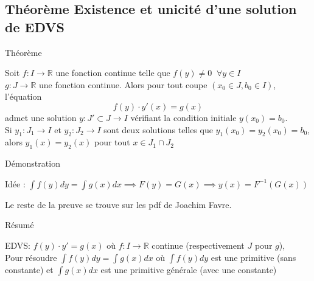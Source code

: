\subsection{Théorème Existence et unicité d'une solution de EDVS}
\begin{parag}{Théorème}
    \begin{theoreme}
        Soit $f: I \to \mathbb{R}$ une fonction continue telle que $f(y) \neq 0 \; \; \forall y \in I$
        \\
        $g : J \to \mathbb{R}$ une fonction continue. Alors pour tout coupe $(x_0 \in J, b_0 \in I)$, l'équation
        \[f(y)\cdot y'(x) = g(x)\]
        admet une solution $y : J' \subset J \to I$ vérifiant la condition initiale $y(x_0) = b_0$.
        \\
        Si $y_1: J_1 \to I $ et $y_2 : J_2 \to I$ sont deux solutions telles que $y_1(x_0) = y_2(x_0) = b_0$, alors $y_1 (x) = y_2(x)$ pour tout $x \in J_1 \cap J_2$
    \end{theoreme}
\end{parag}
\begin{parag}{Démonstration}
    \begin{framedremark}
        Idée : $\int f(y)dy = \int g(x)dx \implies F(y) = G(x) \implies y(x) = F^{-1}(G(x))$
    \end{framedremark}
    Le reste de la preuve se trouve sur les pdf de Joachim Favre.
\end{parag}
\begin{parag}{Résumé}
\begin{resume}
        EDVS:
        $f(y)\cdot y' = g(x)$ où $f: I \to \mathbb{R}$ continue (respectivement $J$ pour $g$), 
        \\
        Pour résoudre $\int f(y)dy = \int g(x)dx$
        où $\int f(y)dy$ est une primitive (sans constante) et $\int g(x)dx$ est une primitive générale (avec une constante)
    \end{resume}    
\end{parag}
